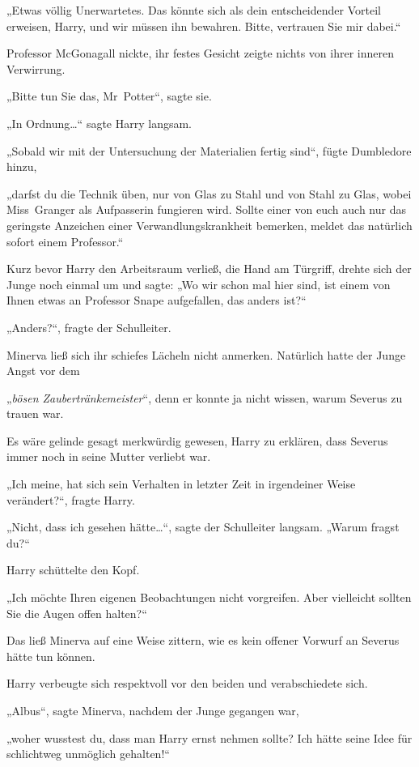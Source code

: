 {„Etwas völlig Unerwartetes. Das könnte sich als dein entscheidender Vorteil erweisen, Harry, und wir müssen ihn bewahren. Bitte, vertrauen Sie mir dabei.“

Professor McGonagall nickte, ihr festes Gesicht zeigte nichts von ihrer inneren Verwirrung.

„Bitte tun Sie das, Mr~Potter“, sagte sie.

„In Ordnung…“ sagte Harry langsam.

„Sobald wir mit der Untersuchung der Materialien fertig sind“, fügte Dumbledore hinzu,

„darfst du die Technik üben, nur von Glas zu Stahl und von Stahl zu Glas, wobei Miss~Granger als Aufpasserin fungieren wird. Sollte einer von euch auch nur das geringste Anzeichen einer Verwandlungskrankheit bemerken, meldet das natürlich sofort einem Professor.“

Kurz bevor Harry den Arbeitsraum verließ, die Hand am Türgriff, drehte sich der Junge noch einmal um und sagte: „Wo wir schon mal hier sind, ist einem von Ihnen etwas an Professor Snape aufgefallen, das anders ist?“

„Anders?“, fragte der Schulleiter.

Minerva ließ sich ihr schiefes Lächeln nicht anmerken. Natürlich hatte der Junge Angst vor dem

„\emph{bösen Zaubertränkemeister}“, denn er konnte ja nicht wissen, warum Severus zu trauen war.

Es wäre gelinde gesagt merkwürdig gewesen, Harry zu erklären, dass Severus immer noch in seine Mutter verliebt war.

„Ich meine, hat sich sein Verhalten in letzter Zeit in irgendeiner Weise verändert?“, fragte Harry.

„Nicht, dass ich gesehen hätte…“, sagte der Schulleiter langsam. „Warum fragst du?“

Harry schüttelte den Kopf.

„Ich möchte Ihren eigenen Beobachtungen nicht vorgreifen. Aber vielleicht sollten Sie die Augen offen halten?“

Das ließ Minerva auf eine Weise zittern, wie es kein offener Vorwurf an Severus hätte tun können.

Harry verbeugte sich respektvoll vor den beiden und verabschiedete sich.

„Albus“, sagte Minerva, nachdem der Junge gegangen war,

„woher wusstest du, dass man Harry ernst nehmen sollte? Ich hätte seine Idee für schlichtweg unmöglich gehalten!“

}
